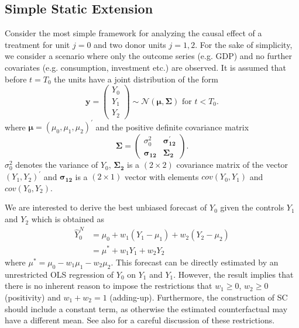 \subsection{Simple Static Extension}
Consider the most simple framework for analyzing the causal effect of a treatment for unit $j = 0$ and two donor units $j = 1,2$. For the sake of simplicity, we consider a scenario where only the outcome series (e.g. \ac{GDP}) and no further covariates (e.g. consumption, investment etc.) are observed. It is assumed that before $t = T_0$ the units have a joint distribution of the form 
\[
\boldsymbol{y} = \begin{pmatrix} Y_0\\ Y_1\\ Y_2 \end{pmatrix} \sim \mathcal{N}(\boldsymbol{\mu},\boldsymbol{\Sigma})
\text{ for } t<T_0.
\] 
where $\boldsymbol{\mu} = \left(\mu_0, \mu_1, \mu_2  \right)^\prime$ and the positive definite covariance matrix
\[
\boldsymbol{\Sigma} = \begin{pmatrix} \sigma_0^2 & \boldsymbol{\sigma_{12}^\prime} \\
	\boldsymbol{\sigma_{12}} & \boldsymbol{\Sigma_2} \end{pmatrix}.
\] 
$\sigma_0^2$ denotes the variance of $Y_0$, $\boldsymbol{\Sigma_2}$ is a $(2 \times 2)$ covariance matrix of the vector $(Y_1, Y_2)^\prime$ and $\boldsymbol{\sigma_{12}}$ is a $(2 \times 1)$ vector with elements $cov(Y_0, Y_1)$ and $cov(Y_0, Y_2)$.

We are interested to derive the best unbiased forecast of $Y_0$ given the controls $Y_1$ and $Y_2$ which is obtained as
\begin{equation*}
	\begin{split}
		\widehat{Y}^{N}_{0} & = \mu_0 + w_1 (Y_1 - \mu_1) + w_2 (Y_2 - \mu_2) \\
		& = \mu^* + w_1 Y_1 + w_2 Y_2
	\end{split}
\end{equation*}
where $\mu^* = \mu_0 - w_1 \mu_1 - w_2 \mu_2$. This forecast can be directly estimated by an unrestricted \ac{OLS} regression of $Y_0$ on $Y_1$ and $Y_1$. However, the result implies that there is no inherent reason to impose the restrictions that $w_1 \geq 0$, $w_2 \geq 0$ (positivity) and $w_1 + w_2 = 1$ (adding-up). Furthermore, the construction of \ac{SC} should include a constant term, as otherwise the estimated counterfactual may have a different mean. See also \cite{doudchenko:2016} for a careful discussion of these restrictions. 

